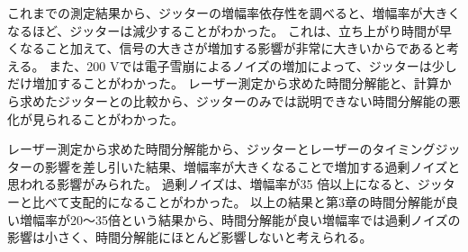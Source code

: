 これまでの測定結果から、ジッターの増幅率依存性を調べると、増幅率が大きくなるほど、ジッターは減少することがわかった。
これは、立ち上がり時間が早くなること加えて、信号の大きさが増加する影響が非常に大きいからであると考える。
また、200 Vでは電子雪崩によるノイズの増加によって、ジッターは少しだけ増加することがわかった。
レーザー測定から求めた時間分解能と、計算から求めたジッターとの比較から、ジッターのみでは説明できない時間分解能の悪化が見られることがわかった。

レーザー測定から求めた時間分解能から、ジッターとレーザーのタイミングジッターの影響を差し引いた結果、増幅率が大きくなることで増加する過剰ノイズと思われる影響がみられた。
過剰ノイズは、増幅率が35 倍以上になると、ジッターと比べて支配的になることがわかった。
以上の結果と第3章の時間分解能が良い増幅率が20〜35倍という結果から、時間分解能が良い増幅率では過剰ノイズの影響は小さく、時間分解能にほとんど影響しないと考えられる。








